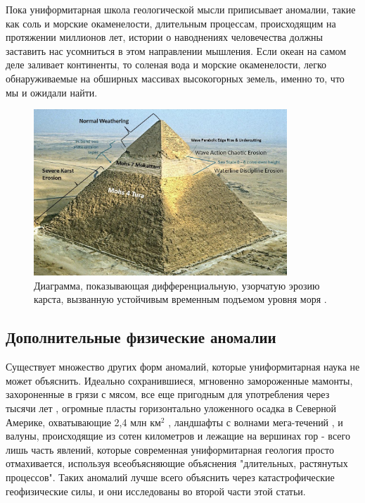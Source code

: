 \documentclass[10pt,twocolumn,letterpaper]{article}
\begin{document}
Пока униформитарная школа геологической мысли приписывает аномалии, такие как соль и морские окаменелости, длительным процессам, происходящим на протяжении миллионов лет, истории о наводнениях человечества должны заставить нас усомниться в этом направлении мышления. Если океан на самом деле заливает континенты, то соленая вода и морские окаменелости, легко обнаруживаемые на обширных массивах высокогорных земель, именно то, что мы и ожидали найти.

\begin{figure}[b]
\begin{center}
\includegraphics[width=0.85\textwidth]{khafre.jpg}
\end{center}
   \caption{Диаграмма, показывающая дифференциальную, узорчатую эрозию карста, вызванную устойчивым временным подъемом уровня моря \cite{27}.}
\label{fig:4}
\end{figure}

\subsection{Дополнительные физические аномалии}

Существует множество других форм аномалий, которые униформитарная наука не может объяснить. Идеально сохранившиеся, мгновенно замороженные мамонты, захороненные в грязи с мясом, все еще пригодным для употребления через тысячи лет \cite{17,18,19}, огромные пласты горизонтально уложенного осадка в Северной Америке, охватывающие 2,4 млн км$^2$ \cite{21}, ландшафты с волнами мега-течений \cite{22}, и валуны, происходящие из сотен километров и лежащие на вершинах гор \cite{23,26} - всего лишь часть явлений, которые современная униформитарная геология просто отмахивается, используя всеобъясняющие объяснения "длительных, растянутых процессов". Таких аномалий лучше всего объяснить через катастрофические геофизические силы, и они исследованы во второй части этой статьи.
\end{document}
